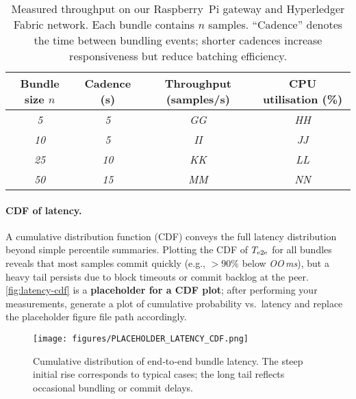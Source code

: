 \begin{table}[h]
  \centering
  \caption{Measured throughput on our Raspberry~Pi gateway and Hyperledger
  Fabric network.  Each bundle contains $n$ samples.  ``Cadence'' denotes the
  time between bundling events; shorter cadences increase responsiveness but
  reduce batching efficiency.}
  \label{tab:throughput}
  \begin{tabular}{cccc}
    \toprule
    Bundle size $n$ & Cadence (s) & Throughput (samples/s) & CPU
    utilisation (\%) \\
    \midrule
    \textit{5} & \textit{5} & \textit{GG} & \textit{HH} \\
    \textit{10} & \textit{5} & \textit{II} & \textit{JJ} \\
    \textit{25} & \textit{10} & \textit{KK} & \textit{LL} \\
    \textit{50} & \textit{15} & \textit{MM} & \textit{NN} \\
    \bottomrule
  \end{tabular}
\end{table}

\paragraph{CDF of latency.}  A cumulative distribution function (CDF) conveys
the full latency distribution beyond simple percentile summaries.  Plotting the
CDF of $T_{\rm e2e}$ for all bundles reveals that most samples commit quickly
(e.g., $>\!90\%$ below \textit{OO\,ms}), but a heavy tail persists due to
block timeouts or commit backlog at the peer.  \autoref{fig:latency-cdf} is a
\textbf{placeholder for a CDF plot}; after performing your measurements,
generate a plot of cumulative probability vs.~latency and replace the
placeholder figure file path accordingly.

\begin{figure}[h]
  \centering
  \texttt{[image: figures/PLACEHOLDER\_LATENCY\_CDF.png]}
  \caption{Cumulative distribution of end‑to‑end bundle latency.  The steep
  initial rise corresponds to typical cases; the long tail reflects occasional
  bundling or commit delays.}
  \label{fig:latency-cdf}
\end{figure}

